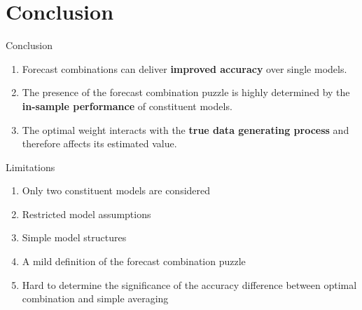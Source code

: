 
\section{Conclusion}

\begin{frame}{Conclusion}
 
 \begin{enumerate}[<+->]
     \item Forecast combinations can deliver \textbf{improved accuracy} over single models.
     \vspace{3mm}
     \item The presence of the forecast combination puzzle is highly determined by the \textbf{in-sample performance} of constituent models.
     \vspace{3mm}
     \item The optimal weight interacts with the \textbf{true data generating process} and therefore affects its estimated value.
 \end{enumerate}

\end{frame}



\begin{frame}{Limitations}

    \begin{enumerate}[<+->]
        \item Only two constituent models are considered
        \vspace{2mm}
        \item Restricted model assumptions
        \vspace{2mm}
        \item Simple model structures
        \vspace{2mm}
        \item A mild definition of the forecast combination puzzle
        \vspace{2mm}
        \item Hard to determine the significance of the accuracy difference between optimal combination and simple averaging
    \end{enumerate}

\end{frame}


